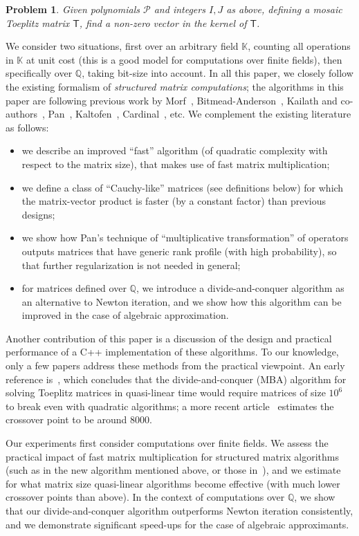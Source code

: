 \documentclass{sig-alternate}
\newcommand{\mT}{\ensuremath{\mathsf{T}}}
\newcommand{\K}{\ensuremath{\mathbb{K}}}
\newcommand{\Q}{\ensuremath{\mathbb{Q}}}
\newtheorem{pbm}{Problem}
\begin{document}
\begin{pbm}\label{pb:mosaic}
  Given polynomials $\mathscr{P}$ and integers $I,J$ as above, 
  defining a mosaic Toeplitz matrix $\mT$, find a non-zero
  vector in the kernel of $\mT$.
\end{pbm}
We consider two situations, first over an arbitrary field $\K$,
counting all operations in $\K$ at unit cost (this is a good model for
computations over finite fields), then specifically over $\Q$, taking
bit-size into account. In all this paper, we closely follow the
existing formalism of {\em structured matrix computations}; the
algorithms in this paper are following previous work by
Morf~\cite{Morf80}, Bitmead-Anderson~\cite{BiAn80}, Kailath and
co-authors~\cite{KaKuMo79,KaSa99}, Pan~\cite{Pan90,Pan92},
Kaltofen~\cite{Kaltofen94}, Cardinal~\cite{Cardinal99}, etc.  We
complement the existing literature as follows:
\begin{itemize}
\item we describe an improved ``fast'' algorithm (of quadratic
  complexity with respect to the matrix size), that makes use of fast
  matrix multiplication;
\item we define a class of ``Cauchy-like'' matrices (see definitions
  below) for which the matrix-vector product is faster (by a constant
  factor) than previous designs;
\item we show how Pan's technique of ``multiplicative transformation''
  of operators outputs matrices that have generic rank profile (with
  high probability), so that further regularization is not needed in
  general;
\item for matrices defined over $\Q$, we introduce a
  divide-and-conquer algorithm as an alternative to Newton iteration,
  and we show how this algorithm can be improved in the case of
  algebraic approximation.
\end{itemize}
Another contribution of this paper is a discussion of the design and
practical performance of a C++ implementation of these algorithms.  To
our knowledge, only a few papers address these methods from the
practical viewpoint. An early reference is~\cite{SeShSp82}, which
concludes that the divide-and-conquer (MBA) algorithm for solving
Toeplitz matrices in quasi-linear time would require matrices of size
$10^6$ to break even with quadratic algorithms; a more recent
article~\cite{Huckle94} estimates the crossover point to be around
$8000$. 

Our experiments first consider computations over finite fields.  We
assess the practical impact of fast matrix multiplication for
structured matrix algorithms (such as in the new algorithm mentioned
above, or those in~\cite{BoJeSc08,BoJeMoSc16}), and we estimate for
what matrix size quasi-linear algorithms become effective (with much
lower crossover points than above). In the context of computations
over $\Q$, we show that our divide-and-conquer algorithm outperforms
Newton iteration consistently, and we demonstrate significant
speed-ups for the case of algebraic approximants.
\end{document}
